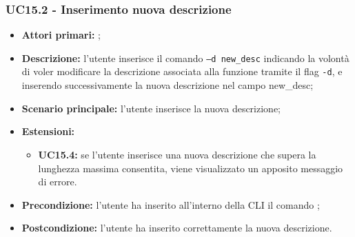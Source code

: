 \subsubsection{UC15.2 - Inserimento nuova descrizione}
\begin{itemize}
	\item \textbf{Attori primari:} \us{};
	\item \textbf{Descrizione:} l'utente inserisce il comando \pedit{} \texttt{–d new\_desc} indicando la volontà di voler modificare la descrizione associata alla funzione tramite il flag \texttt{-d}, e inserendo successivamente la nuova descrizione nel campo new\_desc;
	\item \textbf{Scenario principale:} l’utente inserisce la nuova descrizione;  
	\item \textbf{Estensioni:} 
	\begin{itemize}
		\item \textbf{UC15.4:} se l’utente inserisce una nuova descrizione che supera la lunghezza massima consentita, viene visualizzato un apposito messaggio di errore. 
	\end{itemize}
	\item \textbf{Precondizione:} l’utente ha inserito all’interno della CLI il comando \edit{};
	\item \textbf{Postcondizione:} l’utente ha inserito correttamente la nuova descrizione.
\end{itemize}